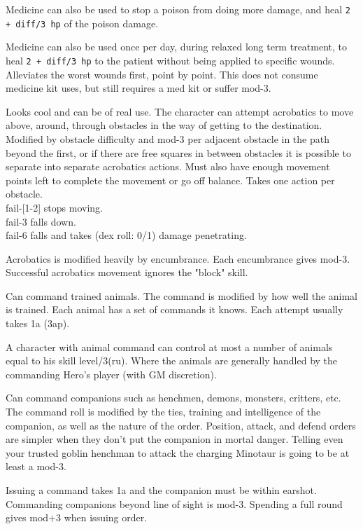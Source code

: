 Medicine can also be used to stop a poison from doing more damage, and heal \verb|2 + diff/3 hp| of the poison damage.

Medicine can also be used once per day, during relaxed long term treatment, to heal \verb|2 + diff/3 hp| to the patient without being applied to specific wounds. Alleviates the worst wounds first, point by point. This does not consume medicine kit uses, but still requires a med kit or suffer mod-3.


 Looks cool and can be of real use. The character can attempt acrobatics to move above, around, through obstacles in the way of getting to the destination. Modified by obstacle difficulty and mod-3 per adjacent obstacle in the path beyond the first, or if there are free squares in between obstacles it is possible to separate into separate acrobatics actions. Must also have enough movement points left to complete the movement or go off balance. Takes one action per obstacle. \\
fail-[1-2] stops moving. \\
fail-3 falls down. \\
fail-6 falls and takes (dex roll: 0/1) damage penetrating.

Acrobatics is modified heavily by encumbrance. Each encumbrance gives mod-3.
Successful acrobatics movement ignores the "block" skill.


 Can command trained animals. The command is modified by how well the animal is trained. Each animal has a set of commands it knows. Each attempt usually takes 1a (3ap).

A character with animal command can control at most a number of animals equal to his skill level/3(ru). Where the animals are generally handled by the commanding Hero's player (with GM discretion).


 Can command companions such as henchmen, demons, monsters, critters, etc. The command roll is modified by the ties, training and intelligence of the companion, as well as the nature of the order. Position, attack, and defend orders are simpler when they don't put the companion in mortal danger. Telling even your trusted goblin henchman to attack the charging Minotaur is going to be at least a mod-3.

Issuing a command takes 1a and the companion must be within earshot. Commanding companions beyond line of sight is mod-3. Spending a full round gives mod+3 when issuing order.

